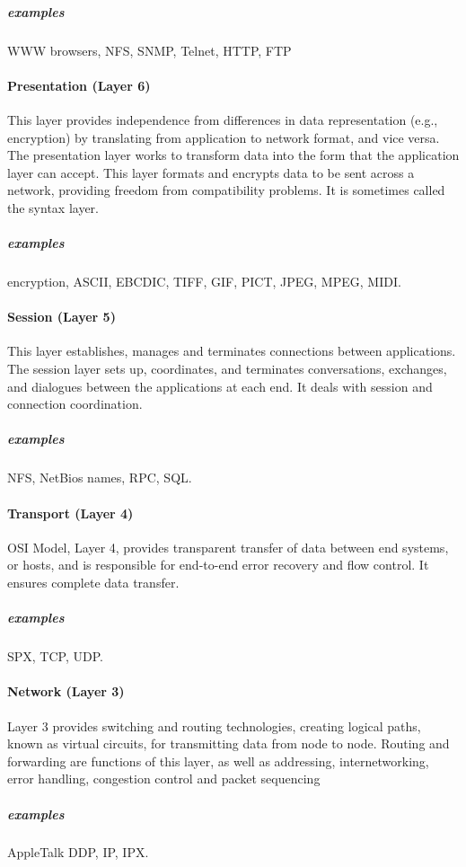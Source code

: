 \documentclass{article}[12pt]
\begin{document}
{\subparagraph{examples} WWW browsers, NFS, SNMP, Telnet, HTTP, FTP


\paragraph{Presentation (Layer 6)}
This layer provides independence from differences in data representation (e.g., encryption) by translating from application to network format, and vice versa.
The presentation layer works to transform data into the form that the application layer can accept.
This layer formats and encrypts data to be sent across a network, providing freedom from compatibility problems.
It is sometimes called the syntax layer.

\subparagraph{examples} encryption, ASCII, EBCDIC, TIFF, GIF, PICT, JPEG, MPEG, MIDI.



\paragraph{Session (Layer 5)}
This layer establishes, manages and terminates connections between applications.
The session layer sets up, coordinates, and terminates conversations, exchanges, and dialogues between the applications at each end.
It deals with session and connection coordination.

\subparagraph{examples} NFS, NetBios names, RPC, SQL.



\paragraph{Transport (Layer 4)}
OSI Model, Layer 4, provides transparent transfer of data between end systems, or hosts, and is responsible for end-to-end error recovery and flow control.
It ensures complete data transfer.
\subparagraph{examples} SPX, TCP, UDP.


\paragraph{Network (Layer 3)}

Layer 3 provides switching and routing technologies, creating logical paths, known as virtual circuits, for transmitting data from node to node.
Routing and forwarding are functions of this layer, as well as addressing, internetworking, error handling, congestion control and packet sequencing

\subparagraph{examples} AppleTalk DDP, IP, IPX.



}
\end{document}

